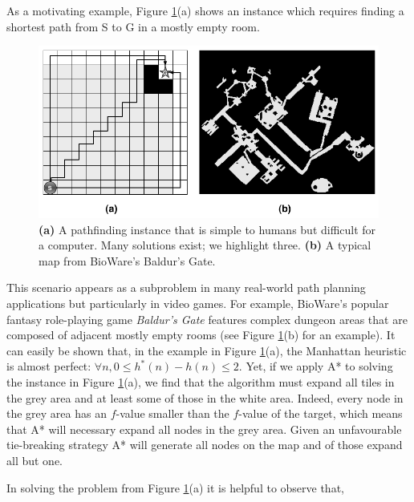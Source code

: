 As a motivating example, Figure \ref{fig-emptymap}(a) shows an instance
which requires finding a shortest path from S to G in a mostly empty room.
\begin{figure}[htbp]
	\vspace{-4pt}
       \begin{center}
         \includegraphics[scale=0.30, trim = 20mm 20mm 20mm 0mm]{diagrams/emptymap.png}
       \end{center}
	\vspace{-3pt}
       \caption{\textbf{(a)} A pathfinding instance that is simple to humans but difficult for a computer. Many solutions exist; we highlight three. 
\textbf{(b)} A typical map from BioWare's Baldur's Gate.}
       \label{fig-emptymap}
	\vspace{-12pt}
\end{figure}
This scenario appears as a subproblem in many real-world path planning applications but particularly
in video games.
For example, BioWare's popular fantasy role-playing game \emph{Baldur's Gate} features complex dungeon
 areas that are composed of adjacent mostly empty rooms (see Figure \ref{fig-emptymap}(b) for an example).
It can easily be shown that, in the example in Figure \ref{fig-emptymap}(a), the Manhattan heuristic is almost perfect: $\forall n, 0 \leq h^*(n) - h(n) \leq 2$.
Yet, if we apply A* \cite{hart68} to solving the instance in Figure \ref{fig-emptymap}(a), 
we find that the algorithm must expand all tiles in the grey 
area and at least some of those in the white area.
Indeed, every node in the grey area has an $f$-value smaller than the $f$-value of the target,
which means that A* will necessary expand all nodes in the grey area.
Given an unfavourable tie-breaking strategy A* will generate all nodes on the map and of those expand 
all but one.
\par
In solving the problem from Figure \ref{fig-emptymap}(a) it is helpful to observe that,
